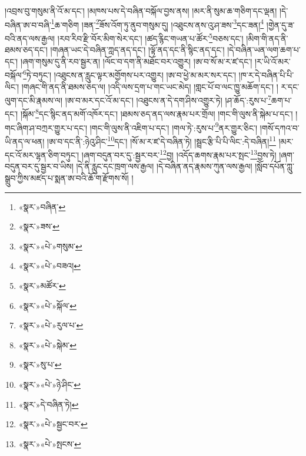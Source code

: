 །འབྲས་བུ་གསུམ་ནི་འོ་མ་དང་། །མཁས་པས་དེ་བཞིན་བསྐོལ་བྱས་ནས། །མར་ནི་སུམ་ཆ་གཅིག་དང་ལྡན། །དེ་བཞིན་ཨ་བ་བཞི་\footnote{«སྣར་»བཞིན་}ཆ་གཅིག །ཟན་\footnote{«སྣར་»ཟས་}ཟོས་འོག་ཏུ་ནུབ་གསུམ་དུ། །འཐུངས་ནས་འུ་ཤ་ཟས་\footnote{«སྣར་»«པེ་»གསུམ་}དང་ཟན།\footnote{«སྣར་»«པེ་»བཟའ།} །གྱེན་དུ་ཟ་བའི་ནད་ལས་རྒྱལ། །རབ་རིབ་རྫི་བོར་མིག་སེར་དང་། །ཚད་རྙིང་གཡན་པ་ཚོར་\footnote{«སྣར་»མཚོར་}བཅས་དང་། །མིག་གི་ནད་ནི་ཐམས་ཅད་དང་། །གཞན་ཡང་དེ་བཞིན་ཀླད་ནད་དང་། །ལྟོ་ནད་དང་ནི་སྙིང་ནད་དང་། །དེ་བཞིན་ཡན་ལག་ཆག་པ་དང་། །ཞག་གསུམ་དུ་ནི་རབ་སྦྱར་ན། །ལོང་བ་དག་ནི་མཐོང་བར་འགྱུར། །ཨ་བ་སོ་མ་ར་ཛ་དང་། །ར་ཡི་འོ་མར་བསྐོལ་\footnote{«སྣར་»«པེ་»སྐོལ་}ཏེ་བཏུང་། །འཐུངས་ན་རླུང་ལྟར་མགྱོགས་པར་འགྱུར། །ཨ་བ་ཕྱེ་མ་མར་སར་དང་། །ཁ་ར་དེ་བཞིན་པི་པི་ལིང་། །གཞང་གི་ནད་ནི་ཐམས་ཅད་ལ། །འདི་ལས་དྲག་པ་གང་ཡང་མེད། །གླང་པོ་བ་ལང་ཁྱུ་མཆོག་དང་། །
ར་དང་ལུག་དང་མི་རྣམས་ལ། །ཨ་བ་མར་དང་འོ་མ་དང་། །འཐུངས་ན་དེ་དག་ཤིས་འགྱུར་ཏེ། །ཤ་ཆོད་:རུས་པ་\footnote{«སྣར་»«པེ་»རུལ་པ་}ཆག་པ་དང་། །སྐོམ་\footnote{«སྣར་»«པེ་»སྐེམ་}དང་སྙིང་ནད་མགོ་འཁོར་དང་། །ཐམས་ཅད་ནད་ལས་རྣམ་པར་གྲོལ། །གང་གི་ལུས་ནི་སྐེམ་པ་དང་། །གང་ཞིག་ཤ་བཀྲར་གྱུར་པ་དང་། །གང་གི་ལུས་ནི་འཇིག་པ་དང་། །གལ་ཏེ་:རུས་པ་\footnote{«སྣར་»སུ་པ་}ནར་གྱུར་ཅིང་། །གསོ་དཀའ་བ་ཡི་ནད་ལ་ཕན། །ཨ་བ་དང་ནི་:ཉེའུ་ཤིང་\footnote{«སྣར་»«པེ་»ཉེ་ཤིང་}དང་། །སོ་མ་ར་ཛ་དེ་བཞིན་ཏེ། །སྦྲང་རྩི་པི་པི་ལིང་:དེ་བཞིན།\footnote{«སྣར་»དེ་བཞིན་ཏེ།} །མར་དང་འོ་མར་ལྷན་ཅིག་བཏུང་། །ཞག་བདུན་བར་དུ་:སྦྱར་བར་\footnote{«སྣར་»«པེ་»སྦྱང་བར་}བྱ། །འདོད་ཆགས་རྣམ་པར་སྤང་\footnote{«སྣར་»«པེ་»སྤངས་}བྱས་ཏེ། །ཞག་བདུན་བར་དུ་སྦྱར་བ་ཡིས། །དེ་ནི་རླུང་དང་ཁྲག་ལས་རྒྱལ། །དེ་བཞིན་ནད་རྣམས་ཀུན་ལས་རྒྱལ། །སློབ་དཔོན་ཀླུ་སྒྲུབ་ཀྱིས་མཛད་པ་སྨན་ཨ་བའི་ཆོ་ག་རྫོགས་སོ། །